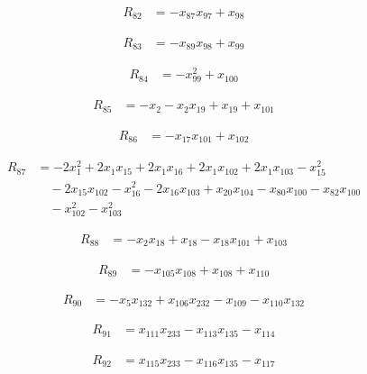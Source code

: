 \begin{align*}
R_{82} &= -x_{87} x_{97} +x_{98}
\end{align*}

\begin{align*}
R_{83} &= -x_{89} x_{98} +x_{99}
\end{align*}

\begin{align*}
R_{84} &= -x_{99}^{2} +x_{100}
\end{align*}

\begin{align*}
R_{85} &= -x_{2} -x_{2} x_{19} +x_{19} +x_{101}
\end{align*}

\begin{align*}
R_{86} &= -x_{17} x_{101} +x_{102}
\end{align*}

\begin{align*}
R_{87} &= -2 x_{1}^{2} +2 x_{1} x_{15} +2 x_{1} x_{16} +2 x_{1} x_{102} +2 x_{1} x_{103} -x_{15}^{2} \\
&\quad -2 x_{15} x_{102} -x_{16}^{2} -2 x_{16} x_{103} +x_{20} x_{104} -x_{80} x_{100} -x_{82} x_{100} \\
&\quad -x_{102}^{2} -x_{103}^{2}
\end{align*}

\begin{align*}
R_{88} &= -x_{2} x_{18} +x_{18} -x_{18} x_{101} +x_{103}
\end{align*}

\begin{align*}
R_{89} &= -x_{105} x_{108} +x_{108} +x_{110}
\end{align*}

\begin{align*}
R_{90} &= -x_{5} x_{132} +x_{106} x_{232} -x_{109} -x_{110} x_{132}
\end{align*}

\begin{align*}
R_{91} &= x_{111} x_{233} -x_{113} x_{135} -x_{114}
\end{align*}

\begin{align*}
R_{92} &= x_{115} x_{233} -x_{116} x_{135} -x_{117}
\end{align*}

